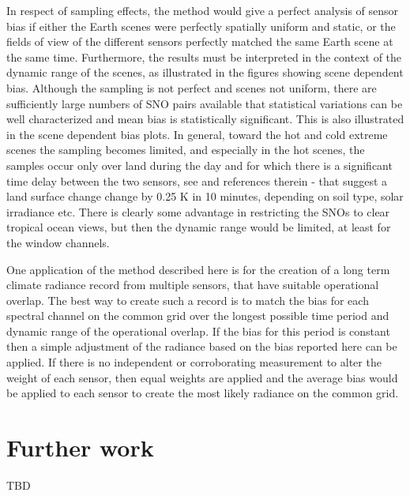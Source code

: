\documentclass[twocolumn,10pt]{article}
\begin{document}
In respect of sampling effects, the method would give a perfect analysis of sensor bias if either the Earth scenes were perfectly spatially uniform and static, or the fields of view of the different sensors perfectly matched the same Earth scene at the same time. Furthermore, the results must be interpreted in the context of the dynamic range of the scenes, as illustrated in the figures showing scene dependent bias. Although the sampling is not perfect and scenes not uniform, there are sufficiently large numbers of SNO pairs available that statistical variations can be well characterized and mean bias is statistically significant. This is also illustrated in the scene dependent bias plots. In general, toward the hot and cold extreme scenes the sampling becomes limited, and especially in the hot scenes, the samples occur only over land during the day and for which there is a significant time delay between the two sensors, see \cite{Duan2014} and references therein - that suggest a land surface change change by 0.25 K in 10 minutes, depending on soil type, solar irradiance etc. There is clearly some advantage in restricting the SNOs to clear tropical ocean views, but then the dynamic range would be limited, at least for the window channels.

One application of the method described here is for the creation of a long term climate radiance record from multiple sensors, that have suitable operational overlap. The best way to create such a record is to match the bias for each spectral channel on the common grid over the longest possible time period and dynamic range of the operational overlap. If the bias for this period is constant then a simple adjustment of the radiance based on the bias reported here can be applied. If there is no independent or corroborating measurement to alter the weight of each sensor, then equal weights are applied and the average bias would be applied to each sensor to create the most likely radiance on the common grid.

\section{Further work}
\label{sec:orgheadline14}
TBD
\end{document}
